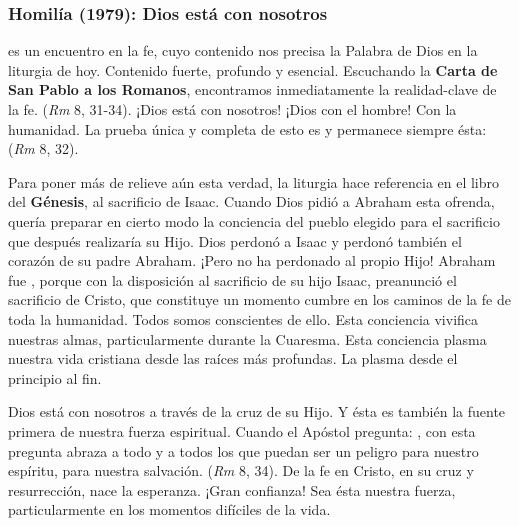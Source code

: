 \subsubsection{Homilía (1979): Dios está con nosotros}


\begin{body}
  es un encuentro en la fe, cuyo contenido nos precisa la Palabra de Dios en la liturgia de hoy. Contenido fuerte, profundo y esencial. Escuchando la \textbf{Carta de San Pablo a los Romanos}, encontramos inmediatamente la realidad-clave de la fe.  (\textit{Rm} 8, 31-34). ¡Dios está con nosotros! ¡Dios con el hombre! Con la humanidad. La prueba única y completa de esto es y permanece siempre ésta:  (\textit{Rm} 8, 32).

Para poner más de relieve aún esta verdad, la liturgia hace referencia en el libro del \textbf{Génesis}, al sacrificio de Isaac. Cuando Dios pidió a Abraham esta ofrenda, quería preparar en cierto modo la conciencia del pueblo elegido para el sacrificio que después realizaría su Hijo. Dios perdonó a Isaac y perdonó también el corazón de su padre Abraham. ¡Pero no ha perdonado al propio Hijo! Abraham fue , porque con la disposición al sacrificio de su hijo Isaac, preanunció el sacrificio de Cristo, que constituye un momento cumbre en los caminos de la fe de toda la humanidad. Todos somos conscientes de ello. Esta conciencia vivifica nuestras almas, particularmente durante la Cuaresma. Esta conciencia plasma nuestra vida cristiana desde las raíces más profundas. La plasma desde el principio al fin.

Dios está con nosotros a través de la cruz de su Hijo. Y ésta es también la fuente primera de nuestra fuerza espiritual. Cuando el Apóstol pregunta: , con esta pregunta abraza a todo y a todos los que puedan ser un peligro para nuestro espíritu, para nuestra salvación.  (\textit{Rm} 8, 34). De la fe en Cristo, en su cruz y resurrección, nace la esperanza. ¡Gran confianza! Sea ésta nuestra fuerza, particularmente en los momentos difíciles de la vida.


\end{body}
